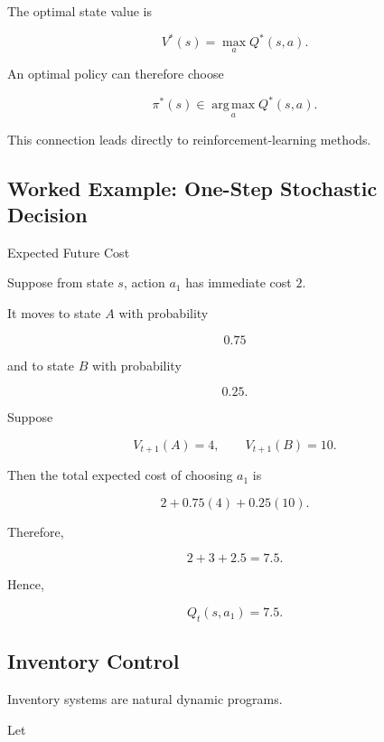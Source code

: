 The optimal state value is

\[
\boxed{
V^*(s)
=
\max_a
Q^*(s,a).
}
\]

An optimal policy can therefore choose

\[
\boxed{
\pi^*(s)
\in
\operatorname*{arg\,max}_a
Q^*(s,a).
}
\]

This connection leads directly to reinforcement-learning methods.

\subsection{Worked Example: One-Step Stochastic Decision}
\label{subsec:worked-stochastic-dp}

\begin{workedexamplebox}{Expected Future Cost}

Suppose from state \(s\), action \(a_1\) has immediate cost \(2\).

It moves to state \(A\) with probability

\[
0.75
\]

and to state \(B\) with probability

\[
0.25.
\]

Suppose

\[
V_{t+1}(A)=4,
\qquad
V_{t+1}(B)=10.
\]

Then the total expected cost of choosing \(a_1\) is

\[
2
+
0.75(4)
+
0.25(10).
\]

Therefore,

\[
2+3+2.5
=
7.5.
\]

Hence,

\begin{answerbox}
\[
\boxed{
Q_t(s,a_1)=7.5.
}
\]
\end{answerbox}

\end{workedexamplebox}

\subsection{Inventory Control}
\label{subsec:inventory-dynamic-programming}

Inventory systems are natural dynamic programs.

Let

